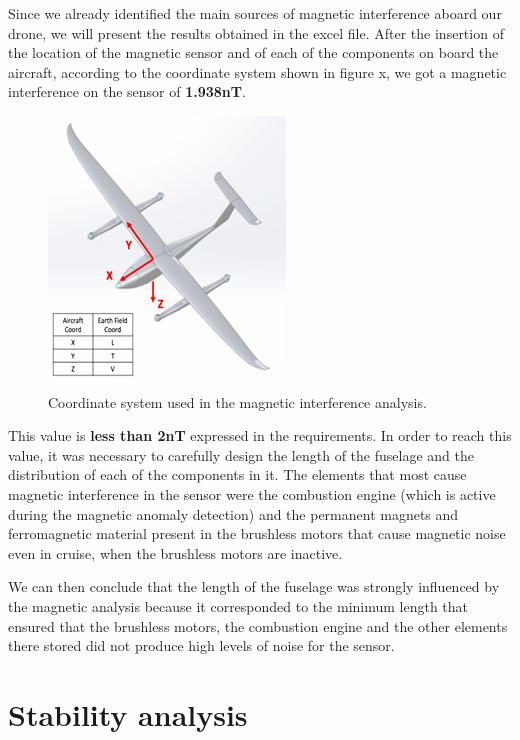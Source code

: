 \documentclass[english,fira]{ist-report}
\begin{document}
Since we already identified the main sources of magnetic interference aboard our drone, we will present the results obtained in the excel file. After the insertion of the location of the magnetic sensor and of each of the components on board the aircraft, according to the coordinate system shown in figure x, we got a magnetic interference on the sensor of \textbf{1.938nT}. 

\begin{figure} [ht]
    \centering
    \includegraphics{graphics/AVIONICS/magnetic.png}
    \caption{Coordinate system used in the magnetic interference analysis.}
    \label{fig:magcoord}
\end{figure}

This value is \textbf{less than 2nT} expressed in the requirements. In order to reach this value, it was necessary to carefully design the length of the fuselage and the distribution of each of the components in it. The elements that most cause magnetic interference in the sensor were the combustion engine (which is active during the magnetic anomaly detection) and the permanent magnets and ferromagnetic material present in the brushless motors that cause magnetic noise even in cruise, when the brushless motors are inactive. \par
We can then conclude that the length of the fuselage was strongly influenced by the magnetic analysis because it corresponded to the minimum length that ensured that the brushless motors, the combustion engine and the other elements there stored did not produce high levels of noise for the sensor.



\chapter{Stability analysis}\label{chap:Stability analysis}
\end{document}
